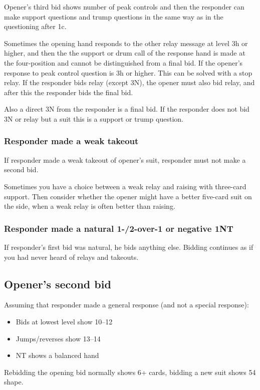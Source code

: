 \documentclass[a4paper, twoside, 11pt]{article}
\begin{document}
\begin{multicols}{3}
Opener's third bid shows
number of peak controls and then the responder can
make support questions and trump questions in the same way
as in the questioning after 1c.

Sometimes the opening hand responds to the other
relay message at level 3h or higher, and then the
the support or drum call of the response hand is made at the four-position
and cannot be distinguished from a final bid.
If the opener's response to
peak control question is 3h or higher.
This can
be solved with a stop relay.
If the responder bids relay
(except 3N), the opener must also bid relay,
and after this the responder bids the final bid.

Also
a direct 3N from the responder is a final bid. If
the responder does not bid 3N or relay but a suit
this is a support or trump question.

\subsubsection*{Responder made a weak takeout}
If responder made a weak takeout of opener's suit, responder must not make a second bid.

Sometimes you have a choice between a weak relay and
raising with three-card support. Then
consider whether the opener might have a better
five-card suit on the side, when a weak
relay is often better than raising.

\subsubsection*{Responder made a natural 1-/2-over-1 or negative 1NT}
If responder's first bid was natural, he bids anything else. Bidding continues as if you had never heard of relays and takeouts.


\subsection*{Opener's second bid}
Assuming that responder made a general response (and not a special response):
\begin{itemize}
    \item Bids at lowest level show 10--12
    \item Jumps/reverses show 13--14
    \item NT shows a balanced hand
\end{itemize}

Rebidding the opening bid normally shows 6+ cards, bidding a new suit shows 54 shape.


\end{multicols}
\end{document}
